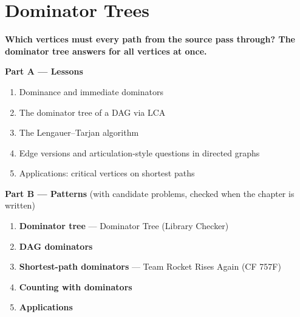 \chapter{Dominator Trees}
\label{ch:dominators}

\begin{tcolorbox}[enhanced, colback=white, colframe=secondaryblue, boxrule=1pt, arc=2mm]
\textbf{\large\textcolor{primaryblue}{Which vertices must every path from the source pass through? The dominator tree answers for all vertices at once.}}
\end{tcolorbox}


\begin{plannedbox}
\textbf{Part A --- Lessons}
\begin{enumerate}[leftmargin=*, label=\textbf{A\arabic*.}, itemsep=1pt]
    \item Dominance and immediate dominators
    \item The dominator tree of a DAG via LCA
    \item The Lengauer--Tarjan algorithm
    \item Edge versions and articulation-style questions in directed graphs
    \item Applications: critical vertices on shortest paths
\end{enumerate}
\textbf{Part B --- Patterns} (with candidate problems, checked when the chapter is written)
\begin{enumerate}[leftmargin=*, label=\textbf{P\arabic*.}, itemsep=1pt]
    \item \textbf{Dominator tree} --- Dominator Tree {\small\color{darkgray}(Library Checker)}
    \item \textbf{DAG dominators}
    \item \textbf{Shortest-path dominators} --- Team Rocket Rises Again {\small\color{darkgray}(CF 757F)}
    \item \textbf{Counting with dominators}
    \item \textbf{Applications}
\end{enumerate}
\end{plannedbox}
